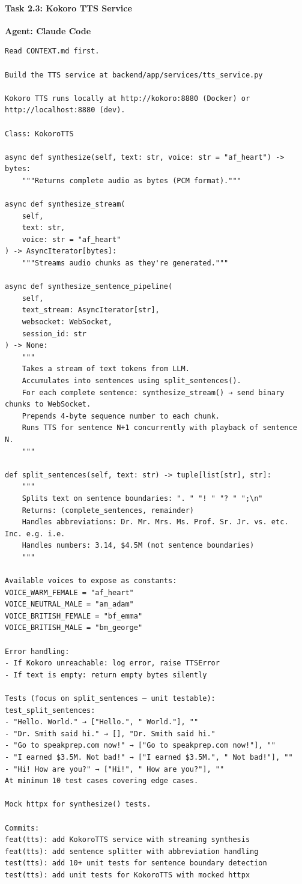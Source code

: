 \documentclass[
  11pt,
]{article}
\begin{document}
\hypertarget{task-2.3-kokoro-tts-service}{%
\paragraph{Task 2.3: Kokoro TTS
Service}\label{task-2.3-kokoro-tts-service}}

\textbf{Agent: Claude Code}

\begin{lstlisting}
Read CONTEXT.md first.

Build the TTS service at backend/app/services/tts_service.py

Kokoro TTS runs locally at http://kokoro:8880 (Docker) or http://localhost:8880 (dev).

Class: KokoroTTS

async def synthesize(self, text: str, voice: str = "af_heart") -> bytes:
    """Returns complete audio as bytes (PCM format)."""

async def synthesize_stream(
    self,
    text: str,
    voice: str = "af_heart"
) -> AsyncIterator[bytes]:
    """Streams audio chunks as they're generated."""

async def synthesize_sentence_pipeline(
    self,
    text_stream: AsyncIterator[str],
    websocket: WebSocket,
    session_id: str
) -> None:
    """
    Takes a stream of text tokens from LLM.
    Accumulates into sentences using split_sentences().
    For each complete sentence: synthesize_stream() → send binary chunks to WebSocket.
    Prepends 4-byte sequence number to each chunk.
    Runs TTS for sentence N+1 concurrently with playback of sentence N.
    """

def split_sentences(self, text: str) -> tuple[list[str], str]:
    """
    Splits text on sentence boundaries: ". " "! " "? " ";\n"
    Returns: (complete_sentences, remainder)
    Handles abbreviations: Dr. Mr. Mrs. Ms. Prof. Sr. Jr. vs. etc. Inc. e.g. i.e.
    Handles numbers: 3.14, $4.5M (not sentence boundaries)
    """

Available voices to expose as constants:
VOICE_WARM_FEMALE = "af_heart"
VOICE_NEUTRAL_MALE = "am_adam"
VOICE_BRITISH_FEMALE = "bf_emma"
VOICE_BRITISH_MALE = "bm_george"

Error handling:
- If Kokoro unreachable: log error, raise TTSError
- If text is empty: return empty bytes silently

Tests (focus on split_sentences — unit testable):
test_split_sentences:
- "Hello. World." → ["Hello.", " World."], ""
- "Dr. Smith said hi." → [], "Dr. Smith said hi."
- "Go to speakprep.com now!" → ["Go to speakprep.com now!"], ""
- "I earned $3.5M. Not bad!" → ["I earned $3.5M.", " Not bad!"], ""
- "Hi! How are you?" → ["Hi!", " How are you?"], ""
At minimum 10 test cases covering edge cases.

Mock httpx for synthesize() tests.

Commits:
feat(tts): add KokoroTTS service with streaming synthesis
feat(tts): add sentence splitter with abbreviation handling
test(tts): add 10+ unit tests for sentence boundary detection
test(tts): add unit tests for KokoroTTS with mocked httpx
\end{lstlisting}
\end{document}
